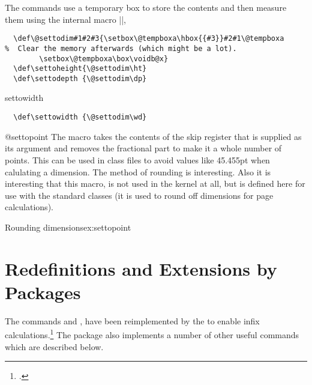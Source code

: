 The \texttt{\setto} commands use a temporary box  to store the contents and then 
measure them using the internal macro |\@settodim|,

\medskip
{}
\begin{verbatim}
  \def\@settodim#1#2#3{\setbox\@tempboxa\hbox{{#3}}#2#1\@tempboxa
%  Clear the memory afterwards (which might be a lot).
        \setbox\@tempboxa\box\voidb@x}
  \def\settoheight{\@settodim\ht}
  \def\settodepth {\@settodim\dp}
\end{verbatim}

\begin{docCommand}{settowidth}{ }
\end{docCommand}
\begin{verbatim}  
  \def\settowidth {\@settodim\wd}
\end{verbatim}



\begin{docCommand}{@settopoint} {}
The 
 macro takes the contents of the skip register that is supplied as its argument
and removes the fractional part to make it a whole number of points. This can be
used in class files to avoid values like 45.455pt when calulating a dimension. The method of
rounding is interesting. Also it is interesting that this macro, is not used in the kernel at all, but is defined
here for use with the standard classes (it is used to round off dimensions for page calculations).
\end{docCommand}

\begin{texexample}{Rounding dimensions}{ex:settopoint}
\bgroup 
  \makeatletter
  \def\@settopoint#1{\divide#1\p@\multiply#1\p@}
  \newlength\@test
  \setlength\@test{19.5pt}
  \@settopoint{\@test}
  \the\@test
  \makeatother
\egroup  
\end{texexample}

\section{Redefinitions and Extensions by Packages}

The commands \cmd{\settolength} and \cmd{\addtolength}, \cmd{\@settodim} have been reimplemented by the  to enable infix calculations.\footcite{calc} The package also implements a number of other useful
commands which are described below. 

